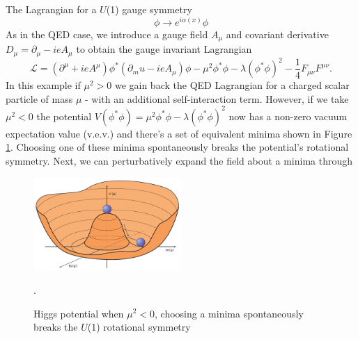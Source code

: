 The Lagrangian for a $U$(1) gauge symmetry 
\begin{equation}
\phi \rightarrow e^{i\alpha(x)}\phi
\end{equation}
As in the QED case, we introduce a gauge field $A_\mu$ and covariant derivative $D_\mu = \partial_\mu - ieA_\mu$ to obtain the gauge invariant Lagrangian
\begin{equation}
\mathcal{L} = (\partial^\mu+ieA^\mu)\phi^*(\partial_mu-ieA_\mu)\phi-\mu^2\phi^*\phi-\lambda(\phi^*\phi)^2-\frac{1}{4}F_{\mu\nu}F^{\mu\nu}.
\end{equation}
In this example if $\mu^2>0$ we gain back the QED Lagrangian for a charged scalar particle of mass $\mu$ - with an additional self-interaction term. However, if we take $\mu^2<0$ the potential $V(\phi^*\phi)=\mu^2\phi^*\phi-\lambda(\phi^*\phi)^2$ now has a non-zero vacuum expectation value (v.e.v.) and there's a set of equivalent minima shown in Figure \ref{fig:HiggsPotential}. Choosing one of these minima spontaneously breaks the potential's rotational symmetry. Next, we can perturbatively expand the field about a minima through
\begin{figure}[H]
    \centering
    \includegraphics[width=0.5\textwidth] {Pictures/HiggsPotential.png}\hspace{1cm}
    \caption{Higgs potential when $\mu^2<0$, choosing a minima spontaneously breaks the $U$(1) rotational symmetry \cite{HiggsPotential}}.
    \label{fig:HiggsPotential}
\end{figure}

